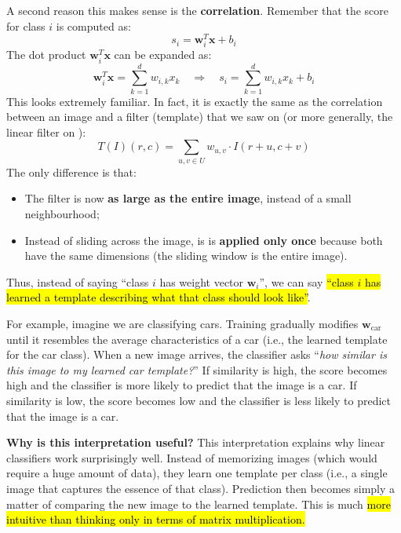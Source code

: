 \highspace
A second reason this makes sense is the \textbf{correlation}. Remember that the score for class $i$ is computed as:
\begin{equation*}
    s_i = \mathbf{w}_{i}^{T} \mathbf{x} + b_i
\end{equation*}
The dot product $\mathbf{w}_{i}^{T} \mathbf{x}$ can be expanded as:
\begin{equation*}
    \mathbf{w}_{i}^{T} \mathbf{x} = \sum_{k=1}^{d} w_{i,k} x_k \quad \Rightarrow \quad s_i = \sum_{k=1}^{d} w_{i,k} x_k + b_i
\end{equation*}
This looks extremely familiar. In fact, it is exactly the same as the correlation between an image and a filter (template) that we saw on  (or more generally, the linear filter on ):
\begin{equation*}
    T\left(I\right)\left(r,c\right) = \sum_{u,v \in U} w_{u,v} \cdot I\left(r+u, c+v\right)
\end{equation*}
The only difference is that:
\begin{itemize}
    \item The filter is now \textbf{as large as the entire image}, instead of a small neighbourhood;
    \item Instead of sliding across the image, is is \textbf{applied only once} because both have the same dimensions (the sliding window is the entire image).
\end{itemize}
Thus, instead of saying ``class $i$ has weight vector $\mathbf{w}_i$'', we can say \hl{``class $i$ has learned a template describing what that class should look like''}.

\highspace
\begin{examplebox}
    For example, imagine we are classifying cars. Training gradually modifies $\mathbf{w}_{\text{car}}$ until it resembles the average characteristics of a car (i.e., the learned template for the car class). When a new image arrives, the classifier asks ``\emph{how similar is this image to my learned car template?}'' If similarity is high, the score becomes high and the classifier is more likely to predict that the image is a car. If similarity is low, the score becomes low and the classifier is less likely to predict that the image is a car.
\end{examplebox}

\highspace
\textcolor{Green3}{ \textbf{Why is this interpretation useful?}} This interpretation explains why linear classifiers work surprisingly well. Instead of memorizing images (which would require a huge amount of data), they learn one template per class (i.e., a single image that captures the essence of that class). Prediction then becomes simply a matter of comparing the new image to the learned template. This is much \hl{more intuitive than thinking only in terms of matrix multiplication.}

